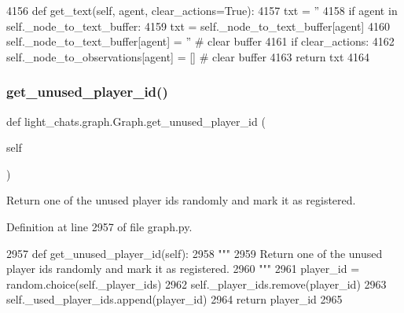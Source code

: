 \begin{DoxyCode}
4156     \textcolor{keyword}{def }get\_text(self, agent, clear\_actions=True):
4157         txt = \textcolor{stringliteral}{''}
4158         \textcolor{keywordflow}{if} agent \textcolor{keywordflow}{in} self.\_node\_to\_text\_buffer:
4159             txt = self.\_node\_to\_text\_buffer[agent]
4160         self.\_node\_to\_text\_buffer[agent] = \textcolor{stringliteral}{''}  \textcolor{comment}{# clear buffer}
4161         \textcolor{keywordflow}{if} clear\_actions:
4162             self.\_node\_to\_observations[agent] = []  \textcolor{comment}{# clear buffer}
4163         \textcolor{keywordflow}{return} txt
4164 
\end{DoxyCode}
\mbox{\label{classlight__chats_1_1graph_1_1Graph_a89bb38305c3d42c4ce2ae8dcc966ab6e}} 
\subsubsection{\texorpdfstring{get\+\_\+unused\+\_\+player\+\_\+id()}{get\_unused\_player\_id()}}
{\footnotesize\ttfamily def light\+\_\+chats.\+graph.\+Graph.\+get\+\_\+unused\+\_\+player\+\_\+id (\begin{DoxyParamCaption}\item[{}]{self }\end{DoxyParamCaption})}

\begin{DoxyVerb}Return one of the unused player ids randomly and mark it as registered.
\end{DoxyVerb}
 

Definition at line 2957 of file graph.\+py.


\begin{DoxyCode}
2957     \textcolor{keyword}{def }get\_unused\_player\_id(self):
2958         \textcolor{stringliteral}{"""}
2959 \textcolor{stringliteral}{        Return one of the unused player ids randomly and mark it as registered.}
2960 \textcolor{stringliteral}{        """}
2961         player\_id = random.choice(self.\_player\_ids)
2962         self.\_player\_ids.remove(player\_id)
2963         self.\_used\_player\_ids.append(player\_id)
2964         \textcolor{keywordflow}{return} player\_id
2965 
\end{DoxyCode}
\mbox{\label{classlight__chats_1_1graph_1_1Graph_aa8a44c495d154f033ea3ced4d6f2e85d}} 
